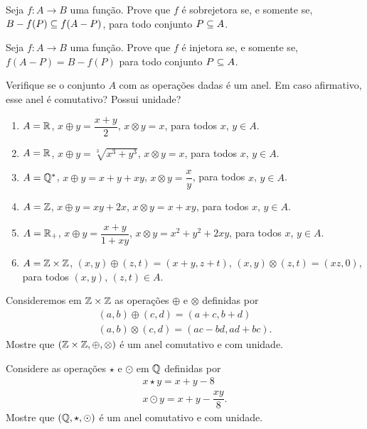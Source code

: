 \documentclass[12pt]{exam}
\begin{document}
    \questao{} Seja $f : A \to B$ uma função. Prove que $f$ é sobrejetora se, e somente se, $B - f(P) \subseteq f(A - P)$, para todo conjunto $P \subseteq A$.

    \vspace{.3cm}

    \questao{} Seja $f: A \to B$ uma função. Prove que $f$ é injetora se, e somente se, $f(A - P) = B - f(P)$ para todo conjunto $P \subseteq A$.

    \vspace{.3cm}

    \questao{} Verifique se o conjunto $A$ com as opera\c{c}\~oes dadas \'e um anel. Em caso afirmativo, esse anel \'e comutativo? Possui unidade?
    \begin{enumerate}[label={\alph*})]
        \item $A = \mathbb{R}$, $x \oplus y = \dfrac{x + y}{2}$, $x \otimes y = x$, para todos $x$, $y \in A$.
        \item $A = \mathbb{R}$, $x \oplus y = \sqrt[3]{x^3 + y^3}$, $x \otimes y = x$, para todos $x$, $y \in A$.
        \item $A = \mathbb{Q}^*$, $x \oplus y = x + y + xy$, $x \otimes y = \dfrac{x}{y}$, para todos $x$, $y \in A$.
        \item $A = \mathbb{Z}$, $x \oplus y = xy + 2x$, $x \otimes y = x + xy$, para todos $x$, $y \in A$.
        \item $A = \mathbb{R}_+$, $x \oplus y = \dfrac{x + y}{1 + xy}$, $x \otimes y = x^2 + y^2 + 2xy$, para todos $x$, $y \in A$.
        \item $A = \mathbb{Z} \times \mathbb{Z}$, $(x, y) \oplus (z, t) = (x + y, z + t)$, $(x, y) \otimes (z, t) = (xz, 0)$, para todos $(x, y)$, $(z, t) \in A$.
    \end{enumerate}

    \vspace{.3cm}

    \questao{} Consideremos em $\mathbb{Z} \times \mathbb{Z}$ as opera\c{c}\~oes $\oplus$ e $\otimes$ definidas por
    \begin{align*}
        (a, b) \oplus (c, d) = (a + c, b + d)\\
        (a ,b) \otimes (c, d) = (ac - bd, ad + bc).
    \end{align*}
    Mostre que $(\mathbb{Z} \times \mathbb{Z}, \oplus, \otimes)$ \'e um anel comutativo e com unidade.

    \vspace{.3cm}

    \questao{} Considere as opera\c{c}\~oes $\star$ e $\odot$ em $\mathbb{Q}$ definidas por
    \begin{align*}
        x \star y = x + y - 8\\
        x \odot y = x + y - \dfrac{xy}{8}.
    \end{align*}
    Mostre que $(\mathbb{Q}, \star, \odot)$ \'e um anel comutativo e com unidade.
\end{document}
